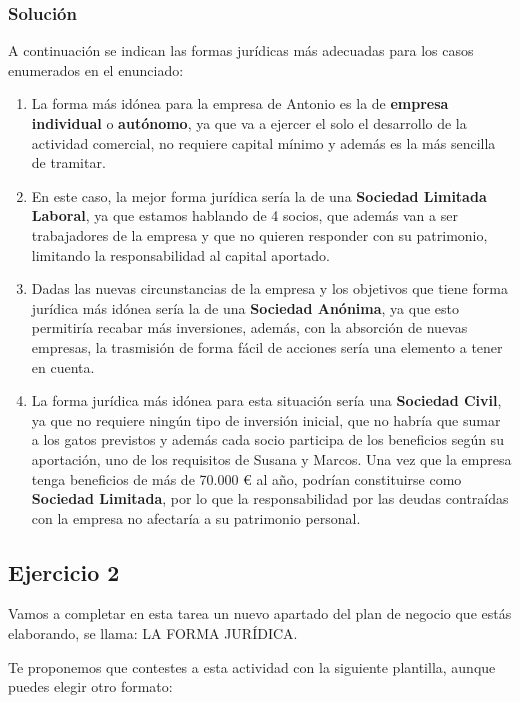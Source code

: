 \subsubsection{Solución}


A continuación se indican las formas jurídicas más adecuadas para los casos enumerados en el enunciado:

\begin{enumerate}[label=\alph*)]
    \item La forma más idónea para la empresa de Antonio es la de \textbf{empresa individual} o \textbf{autónomo}, ya que va a ejercer el solo el desarrollo de la actividad comercial, no requiere capital mínimo y además es la más sencilla de tramitar.

    \item En este caso, la mejor forma jurídica sería la de una \textbf{Sociedad Limitada Laboral}, ya que estamos hablando de 4 socios, que además van a ser trabajadores de la empresa y que no quieren responder con su patrimonio, limitando la responsabilidad al capital aportado.

    \item Dadas las nuevas circunstancias de la empresa y los objetivos que tiene forma jurídica más idónea sería la de
    una \textbf{Sociedad Anónima}, ya que esto permitiría recabar más inversiones, además, con la absorción de nuevas empresas, la trasmisión de forma fácil de acciones sería una elemento a tener en cuenta.

    \item La forma jurídica más idónea para esta situación sería una \textbf{Sociedad Civil}, ya que no requiere ningún tipo de inversión inicial, que no habría que sumar a los gatos previstos y además cada socio participa de los beneficios según su aportación, uno de los requisitos de Susana y Marcos. Una vez que la empresa tenga beneficios de más de 70.000 € al año, podrían constituirse como \textbf{Sociedad Limitada}, por lo que la responsabilidad por las deudas contraídas con la empresa no afectaría a su patrimonio personal.
\end{enumerate}

\subsection{Ejercicio 2}
Vamos a completar en esta tarea un nuevo apartado del plan de negocio que estás elaborando, se llama: LA FORMA JURÍDICA.

Te proponemos que contestes a esta actividad con la siguiente plantilla, aunque puedes elegir otro formato:

